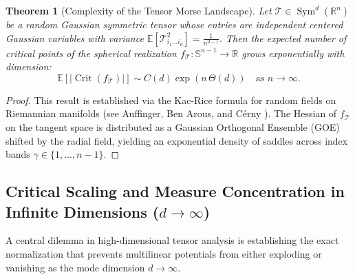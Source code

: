 \documentclass[11pt,a4paper,reqno]{amsart}
\newtheorem{theorem}{Theorem}[section]
\theoremstyle{definition}
\numberwithin{equation}{section}
\newcommand{\R}{\mathbb{R}}
\newcommand{\Sph}{\mathbb{S}}
\begin{document}
\begin{theorem}[Complexity of the Tensor Morse Landscape]
\label{thm:kac_rice_tensors}
Let $\mathcal{T} \in \operatorname{Sym}^d(\R^n)$ be a random Gaussian symmetric tensor whose entries are independent centered Gaussian variables with variance $\mathbb{E}[\mathcal{T}_{i_1 \dots i_d}^2] = \frac{1}{n^{d-1}}$. Then the expected number of critical points of the spherical realization $f_{\mathcal{T}} \colon \Sph^{n-1} \to \R$ grows \emph{exponentially} with dimension:
\begin{equation}
    \mathbb{E}[|\operatorname{Crit}(f_{\mathcal{T}})|] \sim C(d) \exp\left( n \, \Theta(d) \right) \quad \text{as } n \to \infty.
\end{equation}
\end{theorem}
\begin{proof}
This result is established via the Kac-Rice formula for random fields on Riemannian manifolds (see Auffinger, Ben Arous, and C\'erny \cite{auffinger2013random}). The Hessian of $f_{\mathcal{T}}$ on the tangent space is distributed as a Gaussian Orthogonal Ensemble (GOE) shifted by the radial field, yielding an exponential density of saddles across index bands $\gamma \in \{1, \dots, n-1\}$.
\end{proof}

\subsection{Critical Scaling and Measure Concentration in Infinite Dimensions ($d \to \infty$)}
\label{subsec:measure_concentration}

A central dilemma in high-dimensional tensor analysis is establishing the exact normalization that prevents multilinear potentials from either exploding or vanishing as the mode dimension $d \to \infty$.
\end{document}
